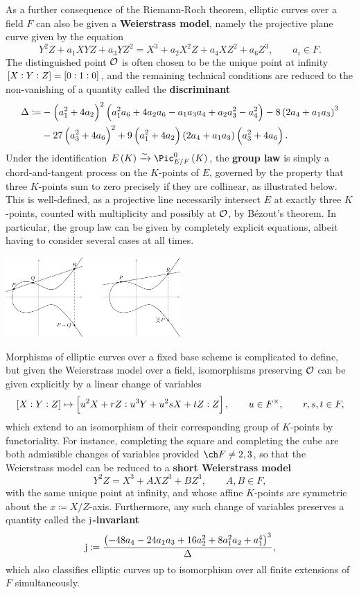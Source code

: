 As a further consequence of the Riemann-Roch theorem, elliptic curves over a field $ F $ can also be given a \textbf{Weierstrass model}, namely the projective plane curve given by the equation
$$ Y^2Z + a_1XYZ + a_3YZ^2 = X^3 + a_2X^2Z + a_4XZ^2 + a_6Z^3, \qquad a_i \in F. $$
The distinguished point $ \mathcal{O} $ is often chosen to be the unique point at infinity $ \sbr{X : Y : Z} = \sbr{0 : 1 : 0} $, and the remaining technical conditions are reduced to the non-vanishing of a quantity called the \textbf{discriminant}
\begin{align*}
\Delta \coloneqq & -\br{a_1^2 + 4a_2}^2\br{a_1^2a_6 + 4a_2a_6 - a_1a_3a_4 + a_2a_3^2 - a_4^2} - 8\br{2a_4 + a_1a_3}^3 \\
& - 27\br{a_3^2 + 4a_6}^2 + 9\br{a_1^2 + 4a_2}\br{2a_4 + a_1a_3}\br{a_3^2 + 4a_6}.
\end{align*}
Under the identification $ E\br{K} \xrightarrow{\sim} \Pic_{E / F}^0\br{K} $, the \textbf{group law} is simply a chord-and-tangent process on the $ K $-points of $ E $, governed by the property that three $ K $-points sum to zero precisely if they are collinear, as illustrated below. This is well-defined, as a projective line necessarily intersect $ E $ at exactly three $ K $-points, counted with multiplicity and possibly at $ \mathcal{O} $, by B\'ezout's theorem. In particular, the group law can be given by completely explicit equations, albeit having to consider several cases at all times.

\begin{center}
\includegraphics[width=0.5\textwidth]{grouplaw.png}
\end{center}

\pagebreak

Morphisms of elliptic curves over a fixed base scheme is complicated to define, but given the Weierstrass model over a field, isomorphisms preserving $ \mathcal{O} $ can be given explicitly by a linear change of variables
$$ \sbr{X : Y : Z} \mapsto \sbr{u^2X + rZ : u^3Y + u^2sX + tZ : Z}, \qquad u \in F^\times, \qquad r, s, t \in F, $$
which extend to an isomorphism of their corresponding group of $ K $-points by functoriality. For instance, completing the square and completing the cube are both admissible changes of variables provided $ \ch F \ne 2, 3 $, so that the Weierstrass model can be reduced to a \textbf{short Weierstrass model}
$$ Y^2Z = X^3 + AXZ^3 + BZ^3, \qquad A, B \in F, $$
with the same unique point at infinity, and whose affine $ K $-points are symmetric about the $ x \coloneqq X / Z $-axis. Furthermore, any such change of variables preserves a quantity called the \textbf{$ \mathrm{j} $-invariant}
$$ \j \coloneqq \dfrac{\br{-48a_4 - 24a_1a_3 + 16a_2^2 + 8a_1^2a_2 + a_1^4}^3}{\Delta}, $$
which also classifies elliptic curves up to isomorphism over all finite extensions of $ F $ simultaneously.

